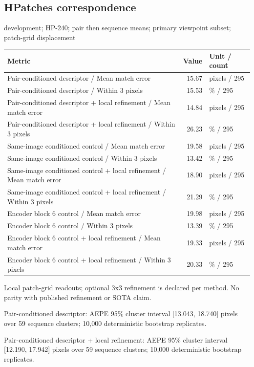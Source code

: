 \documentclass[10pt]{article}
\begin{document}
\subsection{HPatches correspondence}
development; HP-240; pair then sequence means; primary viewpoint subset; patch-grid displacement
\begin{center}\begin{tabular}{p{.57\linewidth}rp{.23\linewidth}}\toprule Metric & Value & Unit / count \\ \midrule
Pair-conditioned descriptor  /  Mean match error & 15.67 & pixels / 295 \\
Pair-conditioned descriptor  /  Within 3 pixels & 15.53 & \% / 295 \\
Pair-conditioned descriptor + local refinement  /  Mean match error & 14.84 & pixels / 295 \\
Pair-conditioned descriptor + local refinement  /  Within 3 pixels & 26.23 & \% / 295 \\
Same-image conditioned control  /  Mean match error & 19.58 & pixels / 295 \\
Same-image conditioned control  /  Within 3 pixels & 13.42 & \% / 295 \\
Same-image conditioned control + local refinement  /  Mean match error & 18.90 & pixels / 295 \\
Same-image conditioned control + local refinement  /  Within 3 pixels & 21.29 & \% / 295 \\
Encoder block 6 control  /  Mean match error & 19.98 & pixels / 295 \\
Encoder block 6 control  /  Within 3 pixels & 13.39 & \% / 295 \\
Encoder block 6 control + local refinement  /  Mean match error & 19.33 & pixels / 295 \\
Encoder block 6 control + local refinement  /  Within 3 pixels & 20.33 & \% / 295 \\
\bottomrule\end{tabular}\end{center}
Local patch-grid readouts; optional 3x3 refinement is declared per method. No parity with published refinement or SOTA claim.

Pair-conditioned descriptor: AEPE 95\% cluster interval [13.043, 18.740] pixels over 59 sequence clusters; 10,000 deterministic bootstrap replicates.

Pair-conditioned descriptor + local refinement: AEPE 95\% cluster interval [12.190, 17.942] pixels over 59 sequence clusters; 10,000 deterministic bootstrap replicates.
\end{document}
